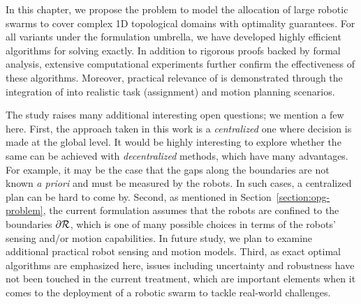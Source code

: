 In this chapter, we propose the \opg problem to model the allocation of 
large robotic swarms to cover complex 1D topological domains with 
optimality guarantees. For all variants under the \opg formulation 
umbrella, we have developed highly efficient algorithms for solving 
\opg exactly. In addition to rigorous proofs backed by formal analysis, 
extensive computational experiments further confirm the effectiveness of 
these algorithms. Moreover, practical relevance of \opg is demonstrated 
through the integration of \opg into realistic task (assignment) and motion 
planning scenarios. 

The study raises many additional interesting open questions; we mention 
a few here. 
%
First, the approach taken in this work is a {\em centralized} one where 
decision is made at the global level. It would be highly interesting to 
explore whether the same can be achieved with {\em decentralized} methods,
which have many advantages. For example, it may be the case that the 
gaps along the boundaries are not known {\em a priori} and must be measured
by the robots. In such cases, a centralized plan can be hard to come by. 
%
Second, as mentioned in Section~\ref{section:opg-problem}, the 
current \opg formulation assumes that the robots are confined to the 
boundaries $\partial \mathcal R$, which is one of many possible choices 
in terms of the robots' sensing and/or motion capabilities. In future study,
we plan to examine additional practical robot sensing and motion models. 
%
Third, as exact optimal algorithms are emphasized here, issues including 
uncertainty and robustness have not been touched in the current treatment, 
which are important elements when it comes to the deployment of a robotic 
swarm to tackle real-world challenges. 